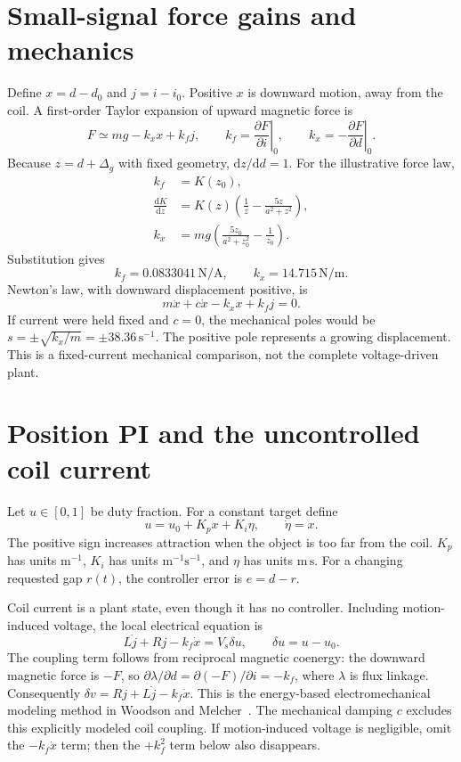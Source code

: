 \documentclass[11pt,letterpaper]{article}
\newcommand{\dd}{\mathrm d}
\begin{document}
\section{Small-signal force gains and mechanics}
Define \(x=d-d_0\) and \(j=i-i_0\). Positive \(x\) is downward motion,
away from the coil. A first-order Taylor expansion of upward magnetic force is
\begin{equation}
 F\simeq mg-k_xx+k_fj,\qquad
 k_f=\left.\frac{\partial F}{\partial i}\right|_0,\qquad
 k_x=-\left.\frac{\partial F}{\partial d}\right|_0.
\end{equation}
Because \(z=d+\Delta_g\) with fixed geometry, \(\dd z/\dd d=1\).
For the illustrative force law,
\begin{align}
 k_f&=K(z_0),\\
 \frac{\dd K}{\dd z}
 &=K(z)\left(\frac1z-\frac{5z}{a^2+z^2}\right),\\
 k_x&=mg\left(\frac{5z_0}{a^2+z_0^2}-\frac1{z_0}\right).
\end{align}
Substitution gives
\begin{equation}
 \boxed{k_f=0.0833041\,\mathrm{N/A},\qquad k_x=14.715\,\mathrm{N/m}.}
\end{equation}
Newton's law, with downward displacement positive, is
\begin{equation}
 \boxed{m\ddot x+c\dot x-k_xx+k_fj=0.}
\end{equation}
If current were held fixed and \(c=0\), the mechanical poles would be
\(s=\pm\sqrt{k_x/m}=\pm38.36\,\mathrm{s^{-1}}\). The positive pole
represents a growing displacement. This is a fixed-current mechanical
comparison, not the complete voltage-driven plant.

\section{Position PI and the uncontrolled coil current}
Let \(u\in[0,1]\) be duty fraction. For a constant target define
\begin{equation}
 \boxed{u=u_0+K_px+K_i\eta,\qquad \dot\eta=x.}
\end{equation}
The positive sign increases attraction when the object is too far from the
coil. \(K_p\) has units \(\mathrm{m^{-1}}\), \(K_i\) has units
\(\mathrm{m^{-1}s^{-1}}\), and \(\eta\) has units \(\mathrm{m\,s}\).
For a changing requested gap \(r(t)\), the controller error is \(e=d-r\).

Coil current is a plant state, even though it has no controller. Including
motion-induced voltage, the local electrical equation is
\begin{equation}
 \boxed{L\dot j+Rj-k_f\dot x=V_s\delta u,\qquad\delta u=u-u_0.}
\end{equation}
The coupling term follows from reciprocal magnetic coenergy: the downward
magnetic force is \(-F\), so
\(\partial\lambda/\partial d=\partial(-F)/\partial i=-k_f\), where
\(\lambda\) is flux linkage. Consequently
\(\delta v=Rj+L\dot j-k_f\dot x\). This is the energy-based
electromechanical modeling method in Woodson and Melcher~\cite{woodson}.
The mechanical damping \(c\) excludes this explicitly modeled coil coupling.
If motion-induced voltage is negligible, omit the \(-k_f\dot x\) term;
then the \(+k_f^2\) term below also disappears.
\end{document}
